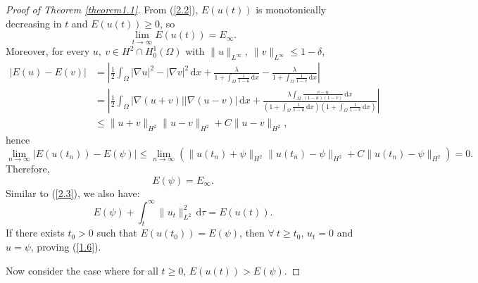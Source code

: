 \documentclass{article}
\numberwithin{equation}{section}
\begin{document}
\begin{proof}[Proof of Theorem \ref{theorem1.1}]
    From (\ref{2.2}), $E(u(t))$ is monotonically decreasing in $t$ and $E(u(t))\ge 0$, so
    $$\lim_{t\to\infty}E(u(t))=E_{\infty}.$$
    Moreover, for every $u,\ v\in H^2\cap H_0^1(\Omega)$ with $\|u\|_{L^{\infty}},\ \|v\|_{L^{\infty}}\le 1-\delta$,
    \begin{align*}
        |E(u)-E(v)|&=\left|\frac{1}{2}\int_{\Omega}|\nabla u|^2-|\nabla v|^2\,\mathrm{d}x+\frac{\lambda}{1+\int_{\Omega}\frac{1}{1-u}\,\mathrm{d}x}-\frac{\lambda}{1+\int_{\Omega}\frac{1}{1-v}\,\mathrm{d}x}\right|\\
        &= \left|\frac{1}{2}\int_{\Omega}|\nabla (u+v)||\nabla (u-v)|\,\mathrm{d}x+\frac{\lambda\int_{\Omega}\frac{v-u}{(1-u)(1-v)}\,\mathrm{d}x}{(1+\int_{\Omega}\frac{1}{1-u}\,\mathrm{d}x)(1+\int_{\Omega}\frac{1}{1-v}\,\mathrm{d}x)}\right|\\
        &\le \|u+v\|_{H^2}\|u-v\|_{H^2}+C\|u-v\|_{H^2},
    \end{align*}
    hence
    $$\lim_{n\to\infty}|E(u(t_n))-E(\psi)|\le \lim_{n\to\infty}(\|u(t_n)+\psi\|_{H^2}\|u(t_n)-\psi\|_{H^2}+C\|u(t_n)-\psi\|_{H^2})=0.$$
    Therefore, $$E(\psi)=E_{\infty}.$$
    Similar to (\ref{2.3}), we also have:
    $$E(\psi)+\int_{t}^{\infty}\|u_t\|_{L^2}^{2}\,\mathrm{d}\tau=E(u(t)).$$
    If there exists $t_0>0$ such that $E(u(t_0))=E(\psi)$, then $\forall\ t\ge t_0$, $u_t=0$ and $u=\psi$, proving (\ref{1.6}).

    Now consider the case where for all $t\ge 0$, $E(u(t))>E(\psi)$.


\end{proof}
\end{document}
